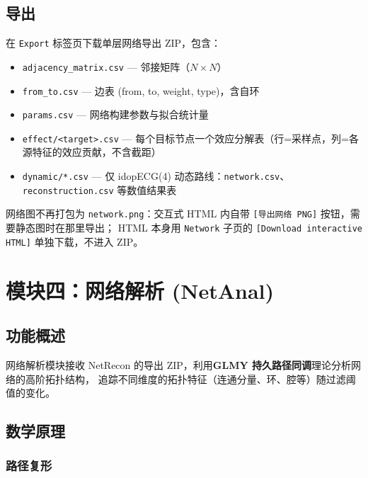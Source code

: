 \documentclass[12pt,a4paper]{ctexart}
\newcommand{\btn}[1]{\texttt{[#1]}}
\newcommand{\tab}[1]{\texttt{#1}}
\newcommand{\file}[1]{\texttt{#1}}
\begin{document}
\subsection{导出}

在 \tab{Export} 标签页下载单层网络导出 ZIP，包含：

\begin{itemize}[leftmargin=*]
    \item \file{adjacency\_matrix.csv} --- 邻接矩阵（$N \times N$）
    \item \file{from\_to.csv} --- 边表 (from, to, weight, type)，含自环
    \item \file{params.csv} --- 网络构建参数与拟合统计量
    \item \file{effect/<target>.csv} --- 每个目标节点一个效应分解表（行=采样点，列=各源特征的效应贡献，不含截距）
    \item \file{dynamic/*.csv} --- 仅 idopECG(4) 动态路线：\file{network.csv}、\file{reconstruction.csv} 等数值结果表
\end{itemize}

网络图不再打包为 \file{network.png}：交互式 HTML 内自带 \btn{导出网络 PNG} 按钮，需要静态图时在那里导出；
HTML 本身用 \tab{Network} 子页的 \btn{Download interactive HTML} 单独下载，不进入 ZIP。

\section{模块四：网络解析 (NetAnal)}

\subsection{功能概述}

网络解析模块接收 NetRecon 的导出 ZIP，利用\textbf{GLMY 持久路径同调}理论分析网络的高阶拓扑结构，
追踪不同维度的拓扑特征（连通分量、环、腔等）随过滤阈值的变化。

\subsection{数学原理}

\subsubsection{路径复形}
\end{document}
